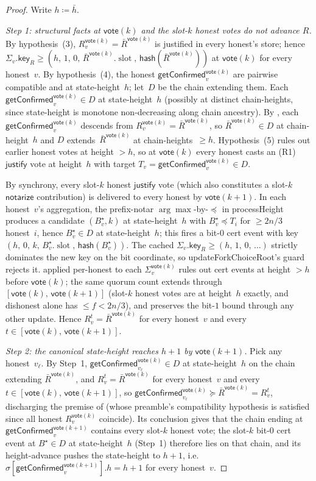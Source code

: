 \ifx\litemode\undefined\documentclass{article}\fi
\newcommand{\slot}[0]{\ensuremath{\operatorname{\mathrm{slot}}}}
\newcommand{\just}{\ensuremath{\mathsf{justify}}\xspace}
\newcommand{\notar}{\ensuremath{\mathsf{notarize}}\xspace}
\newcommand{\hash}{\mathsf{hash}}
\newcommand{\key}{\mathsf{key}}
\newcommand{\vote}{\mathsf{vote}}
\newcommand{\comm}[1]{\bar{#1}}
\newcommand{\processHeight}{\textsf{processHeight}\xspace}
\newcommand{\updateForkChoiceRoot}{\textsf{updateForkChoiceRoot}\xspace}
\newcommand{\getConfirmed}{\textsf{getConfirmed}\xspace}
\theoremstyle{plain}
\theoremstyle{definition}
\theoremstyle{remark}
\begin{document}
\begin{proof}
Write $h \coloneqq \comm{h}$.

\emph{Step 1: structural facts at $\vote(k)$ and the slot-$k$ honest votes do not advance $R$.}
By hypothesis~(3), $R_v^{\vote(k)} = \comm{R}^{\vote(k)}$ is justified in every honest's store; hence $\Sigma_v.\key_R \geq (h,\, 1,\, 0,\, \comm{R}^{\vote(k)}.\slot,\, \hash(\comm{R}^{\vote(k)}))$ at $\vote(k)$ for every honest~$v$.
By hypothesis~(4), the honest $\getConfirmed_v^{\vote(k)}$ are pairwise compatible and at state-height~$h$; let~$D$ be the chain extending them. Each $\getConfirmed_v^{\vote(k)} \in D$ at state-height~$h$ (possibly at distinct chain-heights, since state-height is monotone non-decreasing along chain ancestry).
By , each $\getConfirmed_v^{\vote(k)}$ descends from $R_v^{\vote(k)} = \comm{R}^{\vote(k)}$, so $\comm{R}^{\vote(k)} \in D$ at chain-height~$h$ and $D$ extends~$\comm{R}^{\vote(k)}$ at chain-heights~$\geq h$.
Hypothesis~(5) rules out earlier honest votes at height $>h$, so at $\vote(k)$ every honest casts an (R1) \just vote at height~$h$ with target $T_v = \getConfirmed_v^{\vote(k)} \in D$.

By synchrony, every slot-$k$ honest \just vote (which also constitutes a slot-$k$ \notar contribution) is delivered to every honest by $\vote(k+1)$. In each honest~$v$'s aggregation, the prefix-notar $\arg\max$-by-$\preceq$ in \processHeight{} produces a candidate $(B^\star_v, k)$ at state-height~$h$ with $B^\star_v \preceq T_i$ for $\geq 2n/3$ honest~$i$, hence $B^\star_v \in D$ at state-height~$h$; this fires a bit-$0$ cert event with key $(h,\, 0,\, k,\, B^\star_v.\slot,\, \hash(B^\star_v))$.
The cached $\Sigma_v.\key_R \geq (h,\, 1,\, 0,\, \ldots)$ strictly dominates the new key on the bit coordinate, so \updateForkChoiceRoot{}'s guard rejects it.
 applied per-honest to each $\Sigma_v^{\vote(k)}$ rules out cert events at height $>h$ before $\vote(k)$; the same quorum count extends through $[\vote(k),\, \vote(k+1)]$ (slot-$k$ honest votes are at height~$h$ exactly, and dishonest alone has $\leq f < 2n/3$), and  preserves the bit-$1$ bound through any other update.
Hence $R_v^t = \comm{R}^{\vote(k)}$ for every honest~$v$ and every $t \in [\vote(k),\, \vote(k+1)]$.

\emph{Step 2: the canonical state-height reaches $h+1$ by $\vote(k+1)$.}
Pick any honest~$v_\ell$. By Step~1, $\getConfirmed_{v_\ell}^{\vote(k)} \in D$ at state-height~$h$ on the chain extending $\comm{R}^{\vote(k)}$, and $R_v^t = \comm{R}^{\vote(k)}$ for every honest~$v$ and every $t \in [\vote(k),\, \vote(k+1)]$, so $\getConfirmed_{v_\ell}^{\vote(k)} \succeq \comm{R}^{\vote(k)} = R_v^t$, discharging the premise of  (whose preamble's compatibility hypothesis is satisfied since all honest $R_v^{\vote(k)}$ coincide).
Its conclusion gives that the chain ending at $\getConfirmed_v^{\vote(k+1)}$ contains every slot-$k$ honest vote; the slot-$k$ bit-$0$ cert event at $B^\star \in D$ at state-height~$h$ (Step~1) therefore lies on that chain, and its height-advance pushes the state-height to $h+1$, i.e.\ $\sigma[\getConfirmed_v^{\vote(k+1)}].h = h + 1$ for every honest~$v$.


\end{proof}
\end{document}
